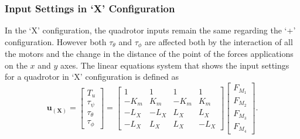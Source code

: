 \subsubsection{Input Settings in `X' Configuration}
In the `X' configuration, the quadrotor inputs remain the same regarding the `+' configuration. However both $\tau_\theta$ and $\tau_\phi$ are affected both by the interaction of all the motors and the change in the distance of the point of the forces applications on the $x$ and $y$ axes. The linear equations system that shows the input settings for a quadrotor in `X' configuration is defined as
\begin{equation}
	\mathbf{u_{(X)}} = \begin{bmatrix}
	T_u\\[5pt]
	\tau_{\psi}\\[5pt]
	\tau_{\theta}\\[5pt]
	\tau_{\phi}
	\end{bmatrix} = \begin{bmatrix}
	1 & 1 & 1 & 1 \\[5pt]
	-K_{m} & K_{m} & -K_{m} & K_{m}\\[5pt]
	-L_{X} & -L_{X} & L_{X} & L_{X}\\[5pt]
	-L_{X} & L_{X} & L_{X} & -L_{X}
							\end{bmatrix}
\begin{bmatrix}
F_{M_1}\\[5pt]
F_{M_2}\\[5pt]
F_{M_3}\\[5pt]
F_{M_4}
\end{bmatrix}.
	\label{ec:U_X}						
\end{equation}

